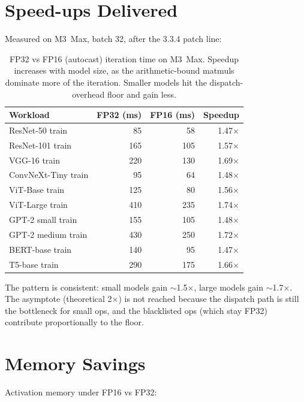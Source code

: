 \section{Speed-ups Delivered}
\label{sec:amp_integration:speedups}

Measured on M3~Max, batch 32, after the 3.3.4 patch line:

\begin{table}[t]
\centering
\small
\begin{tabular}{lrrr}
\toprule
Workload & FP32 (ms) & FP16 (ms) & Speedup \\
\midrule
ResNet-50 train       & 85  & 58  & 1.47$\times$ \\
ResNet-101 train      & 165 & 105 & 1.57$\times$ \\
VGG-16 train          & 220 & 130 & 1.69$\times$ \\
ConvNeXt-Tiny train   & 95  & 64  & 1.48$\times$ \\
ViT-Base train        & 125 & 80  & 1.56$\times$ \\
ViT-Large train       & 410 & 235 & 1.74$\times$ \\
GPT-2 small train     & 155 & 105 & 1.48$\times$ \\
GPT-2 medium train    & 430 & 250 & 1.72$\times$ \\
BERT-base train       & 140 & 95  & 1.47$\times$ \\
T5-base train         & 290 & 175 & 1.66$\times$ \\
\bottomrule
\end{tabular}
\caption[AMP speedups.]{FP32 vs FP16 (autocast) iteration time
on M3~Max. Speedup increases with model size, as the
arithmetic-bound matmuls dominate more of the iteration.
Smaller models hit the dispatch-overhead floor and gain less.}
\label{tab:amp_integration:speedups}
\end{table}

The pattern is consistent: small models gain $\sim$1.5$\times$,
large models gain $\sim$1.7$\times$. The asymptote (theoretical
2$\times$) is not reached because the dispatch path is still
the bottleneck for small ops, and the blacklisted ops (which
stay FP32) contribute proportionally to the floor.

\section{Memory Savings}
\label{sec:amp_integration:memory_savings}

Activation memory under FP16 vs FP32:


